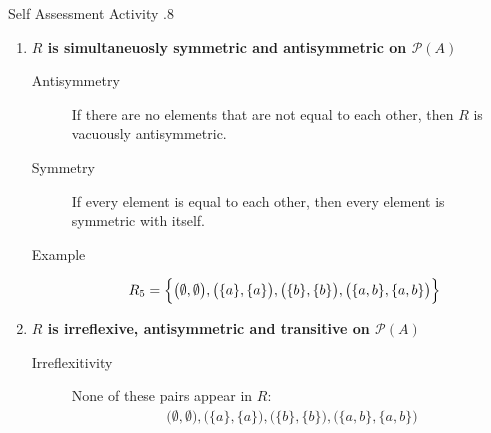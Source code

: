 \documentclass[../notes.tex]{subfiles}
\begin{document}
\begin{exercise}{Self Assessment Activity \thechapter.8}
\begin{enumerate}
\begin{enumerate}[label=(\alph*)]
								\item \textbf{$R$ is simultaneuosly symmetric and antisymmetric on $\mathcal{P}(A)$}
									\begin{description}
										\item[Antisymmetry] If there are no elements that are not equal to each other, then $R$ is vacuously antisymmetric.
										\item[Symmetry] If every element is equal to each other, then every element is symmetric with itself.
										\item[Example]
											\begin{align*}
												R_{5} &= \Bigl\{\bigl(\emptyset, \emptyset\bigr), \bigl(\{a\}, \{a\}\bigr), \bigl(\{b\}, \{b\}\bigr), \bigl(\{a, b\}, \{a, b\}\bigr)\Bigr\}
											\end{align*} 
									\end{description}
								\item \textbf{$R$ is irreflexive, antisymmetric and transitive on $\mathcal{P}(A)$}
									\begin{description}
										\item[Irreflexitivity] None of these pairs appear in $R$:
											\begin{align*}
												\bigl(\emptyset, \emptyset\bigr), \bigl(\{a\}, \{a\}\bigr), \bigl(\{b\}, \{b\}\bigr), \bigl(\{a, b\}, \{a, b\}\bigr)

\end{align*}
\end{description}
\end{enumerate}
\end{enumerate}
\end{exercise}
\end{document}
